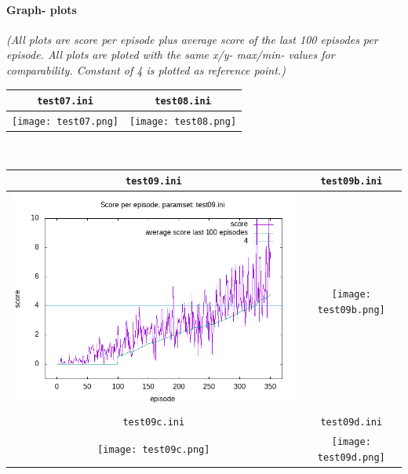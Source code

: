 \documentclass[a4paper]{article}
\begin{document}
\paragraph{Graph- plots}

\textit{(All plots are score per episode plus average score of the last 100 episodes per episode.
All plots are ploted with the same x/y- max/min- values for comparability. Constant of
4 is plotted as reference point.)}
\\
\begin{tabular}{ |c|c| }
  \hline
  \texttt{test07.ini} & \texttt{test08.ini} \\
  \hline
  \texttt{[image: test07.png]} & \texttt{[image: test08.png]} \\
  \hline
\end{tabular}
\\
\begin{tabular}{ |c|c| }
  \hline
  \texttt{test09.ini} & \texttt{test09b.ini} \\
  \hline
  \includegraphics[scale=0.35]{test09.png} & \texttt{[image: test09b.png]} \\
  \hline
  \texttt{test09c.ini} & \texttt{test09d.ini} \\
  \hline
  \texttt{[image: test09c.png]} & \texttt{[image: test09d.png]} \\
  \hline
\end{tabular}
\end{document}
